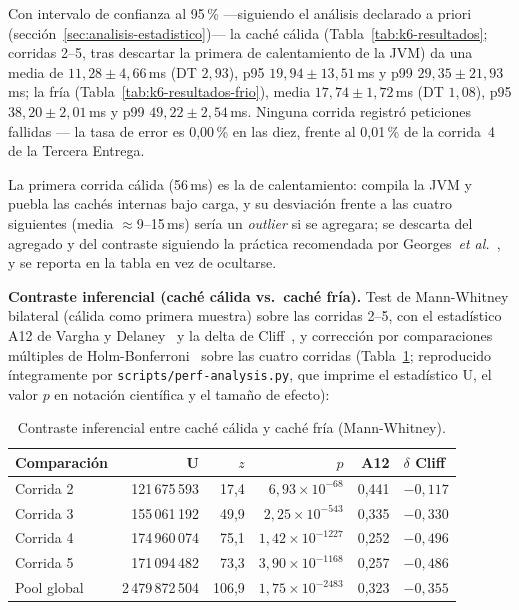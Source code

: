 \documentclass[11pt,a4paper]{article}
\newcommand{\ruta}[1]{\texttt{\footnotesize #1}}
\begin{document}
Con intervalo de confianza al 95\,\% —siguiendo el análisis declarado a
priori (sección~\ref{sec:analisis-estadistico})— la caché cálida
(Tabla~\ref{tab:k6-resultados}; corridas
2--5, tras descartar la primera de calentamiento de la JVM) da una media de
$11{,}28 \pm 4{,}66$\,ms (DT $2{,}93$), p95 $19{,}94 \pm 13{,}51$\,ms y
p99 $29{,}35 \pm 21{,}93$\,ms; la fría (Tabla~\ref{tab:k6-resultados-frio}),
media $17{,}74 \pm 1{,}72$\,ms
(DT $1{,}08$), p95 $38{,}20 \pm 2{,}01$\,ms y p99 $49{,}22 \pm 2{,}54$\,ms.
Ninguna corrida registró peticiones fallidas — la tasa de error es
0,00\,\% en las diez, frente al 0,01\,\% de la corrida~4 de la
Tercera Entrega.

La primera corrida cálida (56\,ms) es la de calentamiento: compila la
JVM y puebla las cachés internas bajo carga, y su desviación frente a las
cuatro siguientes (media $\approx$9--15\,ms) sería un \emph{outlier} si se
agregara; se descarta del agregado y del contraste siguiendo la práctica
recomendada por Georges~\emph{et al.}~\cite{georges2007benchmarking}, y se
reporta en la tabla en vez de ocultarse.

\textbf{Contraste inferencial (caché cálida vs.\ caché fría).} Test de
Mann-Whitney bilateral (cálida como primera muestra) sobre las corridas
2--5, con el estadístico A12 de Vargha y Delaney~\cite{varghadelaney2000}
y la delta de Cliff~\cite{cliff1993}, y corrección por comparaciones
múltiples de Holm-Bonferroni~\cite{holm1979} sobre las cuatro corridas
(Tabla~\ref{tab:inferencial}; reproducido íntegramente por
\ruta{scripts/perf-analysis.py}, que imprime el estadístico U, el valor
$p$ en notación científica y el tamaño de efecto):

\begin{table}[htbp]
\centering
\caption{Contraste inferencial entre caché cálida y caché fría (Mann-Whitney).}
\label{tab:inferencial}
\begin{tabular}{@{}lrrrrl@{}}
\toprule
\textbf{Comparación} & \textbf{U} & \textbf{$z$} & \textbf{$p$} & \textbf{A12} & \textbf{$\delta$ Cliff} \\
\midrule
Corrida 2 & 121\,675\,593 & 17,4 & $6{,}93 \times 10^{-68}$ & 0,441 & $-0{,}117$ \\
Corrida 3 & 155\,061\,192 & 49,9 & $2{,}25 \times 10^{-543}$ & 0,335 & $-0{,}330$ \\
Corrida 4 & 174\,960\,074 & 75,1 & $1{,}42 \times 10^{-1227}$ & 0,252 & $-0{,}496$ \\
Corrida 5 & 171\,094\,482 & 73,3 & $3{,}90 \times 10^{-1168}$ & 0,257 & $-0{,}486$ \\
Pool global & 2\,479\,872\,504 & 106,9 & $1{,}75 \times 10^{-2483}$ & 0,323 & $-0{,}355$ \\
\bottomrule
\end{tabular}
\end{table}
\end{document}

